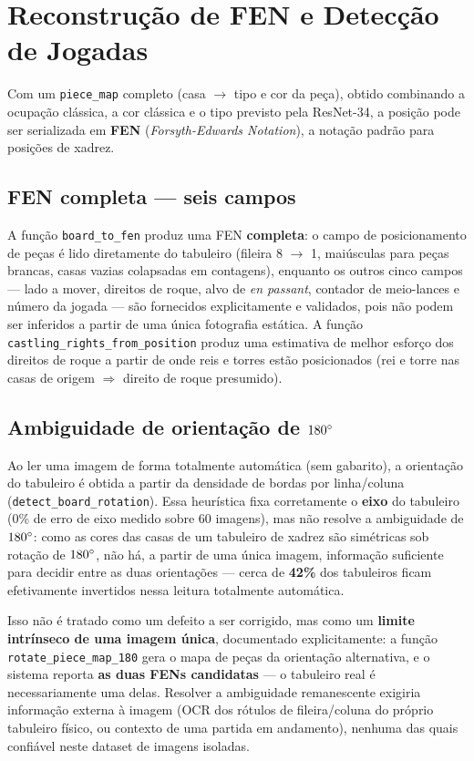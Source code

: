 \section{Reconstrução de FEN e Detecção de Jogadas}
\label{sec:fen-jogadas}

Com um \texttt{piece\_map} completo (casa $\to$ tipo e cor da peça), obtido combinando a
ocupação clássica, a cor clássica e o tipo previsto pela ResNet-34, a posição pode ser
serializada em \textbf{FEN} (\textit{Forsyth-Edwards Notation}), a notação padrão para
posições de xadrez.

\subsection{FEN completa --- seis campos}

A função \texttt{board\_to\_fen} produz uma FEN \textbf{completa}: o campo de
posicionamento de peças é lido diretamente do tabuleiro (fileira 8 $\to$ 1, maiúsculas
para peças brancas, casas vazias colapsadas em contagens), enquanto os outros cinco
campos --- lado a mover, direitos de roque, alvo de \textit{en passant}, contador de
meio-lances e número da jogada --- são fornecidos explicitamente e validados, pois não
podem ser inferidos a partir de uma única fotografia estática. A função
\texttt{castling\_rights\_from\_position} produz uma estimativa de melhor esforço dos
direitos de roque a partir de onde reis e torres estão posicionados (rei e torre nas
casas de origem $\Rightarrow$ direito de roque presumido).

\subsection{Ambiguidade de orientação de $180\degree$}

Ao ler uma imagem de forma totalmente automática (sem gabarito), a orientação do
tabuleiro é obtida a partir da densidade de bordas por linha/coluna
(\texttt{detect\_board\_rotation}). Essa heurística fixa corretamente o \textbf{eixo} do
tabuleiro (0\% de erro de eixo medido sobre 60 imagens), mas não resolve a ambiguidade de
$180\degree$: como as cores das casas de um tabuleiro de xadrez são simétricas sob
rotação de $180\degree$, não há, a partir de uma única imagem, informação suficiente
para decidir entre as duas orientações --- cerca de \textbf{42\%} dos tabuleiros ficam
efetivamente invertidos nessa leitura totalmente automática.

Isso não é tratado como um defeito a ser corrigido, mas como um \textbf{limite
intrínseco de uma imagem única}, documentado explicitamente: a função
\texttt{rotate\_piece\_map\_180} gera o mapa de peças da orientação alternativa, e o
sistema reporta \textbf{as duas FENs candidatas} --- o tabuleiro real é necessariamente
uma delas. Resolver a ambiguidade remanescente exigiria informação externa à imagem
(OCR dos rótulos de fileira/coluna do próprio tabuleiro físico, ou contexto de uma
partida em andamento), nenhuma das quais confiável neste dataset de imagens isoladas.

